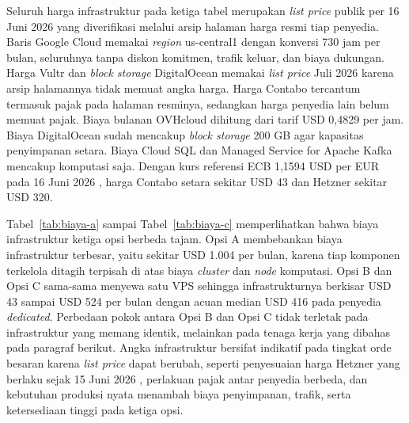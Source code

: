 Seluruh harga infrastruktur pada ketiga tabel merupakan \textit{list price} publik per 16 Juni 2026 yang diverifikasi melalui arsip halaman harga resmi tiap penyedia. Baris Google Cloud memakai \textit{region} us-central1 dengan konversi 730 jam per bulan, seluruhnya tanpa diskon komitmen, trafik keluar, dan biaya dukungan. Harga Vultr dan \textit{block storage} DigitalOcean memakai \textit{list price} Juli 2026 karena arsip halamannya tidak memuat angka harga. Harga Contabo tercantum termasuk pajak pada halaman resminya, sedangkan harga penyedia lain belum memuat pajak. Biaya bulanan OVHcloud dihitung dari tarif USD 0,4829 per jam. Biaya DigitalOcean sudah mencakup \textit{block storage} 200 GB agar kapasitas penyimpanan setara. Biaya Cloud SQL dan Managed Service for Apache Kafka mencakup komputasi saja. Dengan kurs referensi ECB 1,1594 USD per EUR pada 16 Juni 2026 \autocite{ecb2026}, harga Contabo setara sekitar USD 43 dan Hetzner sekitar USD 320.

Tabel~\ref{tab:biaya-a} sampai Tabel~\ref{tab:biaya-c} memperlihatkan bahwa biaya infrastruktur ketiga opsi berbeda tajam. Opsi A membebankan biaya infrastruktur terbesar, yaitu sekitar USD 1.004 per bulan, karena tiap komponen terkelola ditagih terpisah di atas biaya \textit{cluster} dan \textit{node} komputasi. Opsi B dan Opsi C sama-sama menyewa satu VPS sehingga infrastrukturnya berkisar USD 43 sampai USD 524 per bulan dengan acuan median USD 416 pada penyedia \textit{dedicated}. Perbedaan pokok antara Opsi B dan Opsi C tidak terletak pada infrastruktur yang memang identik, melainkan pada tenaga kerja yang dibahas pada paragraf berikut. Angka infrastruktur bersifat indikatif pada tingkat orde besaran karena \textit{list price} dapat berubah, seperti penyesuaian harga Hetzner yang berlaku sejak 15 Juni 2026 \autocite{hetzner2026}, perlakuan pajak antar penyedia berbeda, dan kebutuhan produksi nyata menambah biaya penyimpanan, trafik, serta ketersediaan tinggi pada ketiga opsi.







